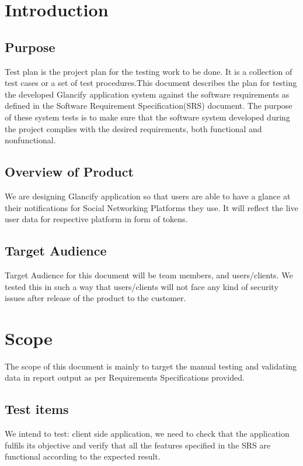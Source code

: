 \documentclass[12pt]{article}
\begin{document}
	\newpage
	\tableofcontents
	\newpage
	
	\section{Introduction}
    \subsection{Purpose}
	 Test plan is the project plan for the testing work to be done. It is a collection of test cases or a set of test procedures.This document describes the plan for testing the developed Glancify application system against the software requirements as defined in the Software Requirement Specification(SRS) document. The purpose of these system tests is to make sure that the software system developed during the project complies with the desired requirements, both functional and nonfunctional.
    
    \subsection{Overview of Product}
    We are designing Glancify application so that users are able to have a glance at their notifications for Social Networking Platforms they use. It will reflect the live user data for respective platform in form of tokens.
    
    \subsection{Target Audience}
    Target Audience for this document will be team members, and users/clients. We tested this in such a way that users/clients will not face any kind of security issues after release of the product to the customer.
    
    \section{Scope}
    The scope of this document is mainly to target the manual testing and validating data in report output as per Requirements Specifications provided.
    
    \subsection{Test items}
    We intend to test: client side application, we need to check that the application fulfils its objective and verify that all the features specified in the SRS are functional according to the expected result.
    
\end{document}
